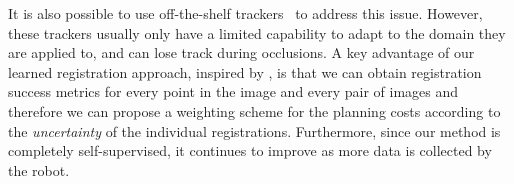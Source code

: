 It is also possible to use off-the-shelf trackers~\cite{lucas1981iterative,brox2004high,babenko2009visual,mei2009robust} to address this issue. However, these trackers usually only have a limited capability to adapt to the domain they are applied to, and can lose track during occlusions. A key advantage of our learned registration approach, inspired by \cite{meister2017unflow}, is that we can obtain registration success metrics for every point in the image and every pair of images and therefore we can propose a weighting scheme for the planning costs according to the \emph{uncertainty} of the individual registrations. Furthermore, since our method is completely self-supervised, it continues to improve as more data is collected by the robot.



